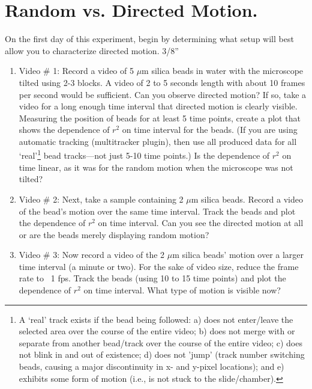 \section{Random vs. Directed Motion.}
On the first day of this experiment, begin by determining what setup will best allow you to characterize directed motion. 3/8''
\begin{enumerate}
\item Video \# 1: Record a video of 5 $\mu$m silica beads in water with the microscope tilted using 2-3 blocks. A video of 2 to 5 seconds length with about 10 frames per second would be sufficient. Can you observe directed motion? If so, take a video for a long enough time interval that directed motion is clearly visible. Measuring the position of beads for at least 5 time points, create a plot that shows the dependence of $r^{2}$ on time interval for the beads. (If you are using automatic tracking (multitracker plugin), then use all produced data for all `real'\footnote{
A `real' track exists if the bead being followed: a) does not enter/leave the selected area over the course of the entire video; b) does not merge with or separate from another bead/track over the course of the entire video; c) does not blink in and out of existence; d) does not 'jump' (track number switching beads, causing a major discontinuity in x- and y-pixel locations); and e) exhibits some form of motion (i.e., is not stuck to the slide/chamber).} 
bead tracks—not just 5-10 time points.) Is the dependence of $r^{2}$ on time linear, as it was for the random motion when the microscope was not tilted?
\item Video \# 2: Next, take a sample containing 2 $\mu$m silica beads. Record a video of the bead's motion over the same time interval. Track the beads and plot the dependence of $r^{2}$ on time interval. Can you see the directed motion at all or are the beads merely displaying random motion?
\item Video \# 3: Now record a video of the 2 $\mu$m silica beads' motion over a larger time interval (a minute or two). For the sake of video size, reduce the frame rate to ~1 fps. Track the beads (using 10 to 15 time points) and plot the dependence of $r^{2}$ on time interval. What type of motion is visible now?
\end{enumerate}
